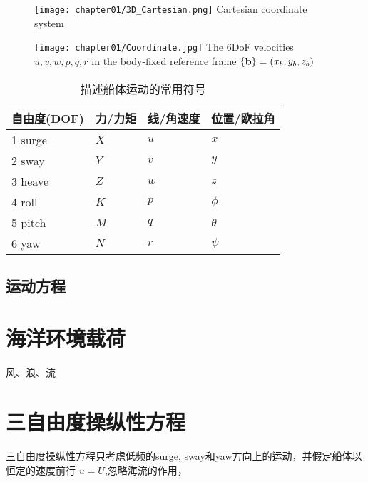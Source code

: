 \begin{figure}[!htp]
  \centering
  \texttt{[image: chapter01/3D\_Cartesian.png]}
    {Cartesian coordinate system}
  \label{fig:3Dcartesian}
\end{figure}

\begin{figure}[!htp]
  \centering
  \texttt{[image: chapter01/Coordinate.jpg]}
    {The 6DoF velocities $u,v,w,p,q,r$ in the body-fixed reference frame
    $\left\{ \mathbf{b} \right\}=(x_b, y_b, z_b)$  }
  \label{fig:Coordinate}
\end{figure}


\begin{table}[htbp]
  \centering
  \caption{描述船体运动的常用符号}
    \begin{tabular}{llll}
    \toprule
    自由度(DOF) & 力/力矩  & 线/角速度 & 位置/欧拉角 \\
    \midrule
    1 \quad surge & $X$     & $u$     & $x$ \\
    2 \quad sway &  $Y$     & $v$     & $y$ \\
    3 \quad heave & $Z$     & $w$     & $z$ \\
    4 \quad roll & $K$     &  $p$     & $\phi$ \\
    5 \quad pitch & $M$     & $q$     & $\theta$ \\
    6 \quad yaw & $N$     &   $r$     & $\psi$ \\
    \bottomrule
    \end{tabular}%
  \label{tab:notation}%
\end{table}%

\subsection{运动方程}


\section{海洋环境载荷}
风、浪、流


\section{三自由度操纵性方程}
三自由度操纵性方程只考虑低频的surge, sway和yaw方向上的运动，并假定船体以恒定的速度前行
$u=U$,忽略海流的作用，

